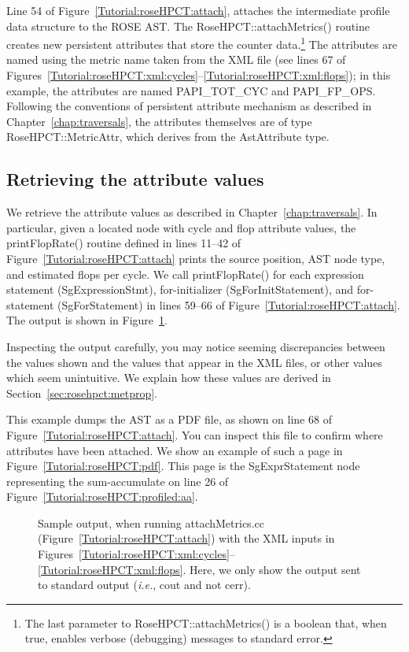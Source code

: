 Line 54 of Figure~\ref{Tutorial:roseHPCT:attach}, attaches the
intermediate profile data structure to the ROSE AST. The
RoseHPCT::attachMetrics() routine creates new persistent attributes
that store the counter data.\footnote{The last parameter to
RoseHPCT::attachMetrics() is a boolean that, when true, enables
verbose (debugging) messages to standard error.}  The attributes are
named using the metric name taken from the XML file (see lines 67 of
Figures~\ref{Tutorial:roseHPCT:xml:cycles}--\ref{Tutorial:roseHPCT:xml:flops});
in this example, the attributes are named PAPI\_TOT\_CYC and
PAPI\_FP\_OPS. Following the conventions of persistent attribute
mechanism as described in Chapter~\ref{chap:traversals}, the
attributes themselves are of type RoseHPCT::MetricAttr, which derives
from the AstAttribute type.

\subsection{Retrieving the attribute values}

We retrieve the attribute values as described in
Chapter~\ref{chap:traversals}.  In particular, given a located node
with cycle and flop attribute values, the printFlopRate() routine
defined in lines 11--42 of Figure~\ref{Tutorial:roseHPCT:attach}
prints the source position, AST node type, and estimated flops per
cycle. We call printFlopRate() for each expression statement
(SgExpressionStmt), for-initializer (SgForInitStatement), and
for-statement (SgForStatement) in lines 59--66 of
Figure~\ref{Tutorial:roseHPCT:attach}. The output is shown in
Figure~\ref{Tutorial:roseHPCT:profiled:out}.

Inspecting the output carefully, you may notice seeming discrepancies
between the values shown and the values that appear in the XML files,
or other values which seem unintuitive. We explain how these values
are derived in Section~\ref{sec:rosehpct:metprop}.

This example dumps the AST as a PDF file, as shown on line 68 of
Figure~\ref{Tutorial:roseHPCT:attach}. You can inspect this file to
confirm where attributes have been attached. We show an example of
such a page in Figure~\ref{Tutorial:roseHPCT:pdf}. This page is the
SgExprStatement node representing the sum-accumulate on line 26 of
Figure~\ref{Tutorial:roseHPCT:profiled:aa}.

\begin{figure}[!ht]
{\mySmallFontSize
  
}
\caption{Sample output, when running attachMetrics.cc
(Figure~\ref{Tutorial:roseHPCT:attach}) with the XML inputs in
Figures~\ref{Tutorial:roseHPCT:xml:cycles}--\ref{Tutorial:roseHPCT:xml:flops}. Here,
we only show the output sent to standard output (\emph{i.e.}, cout and
not cerr).}
\label{Tutorial:roseHPCT:profiled:out}
\end{figure}

